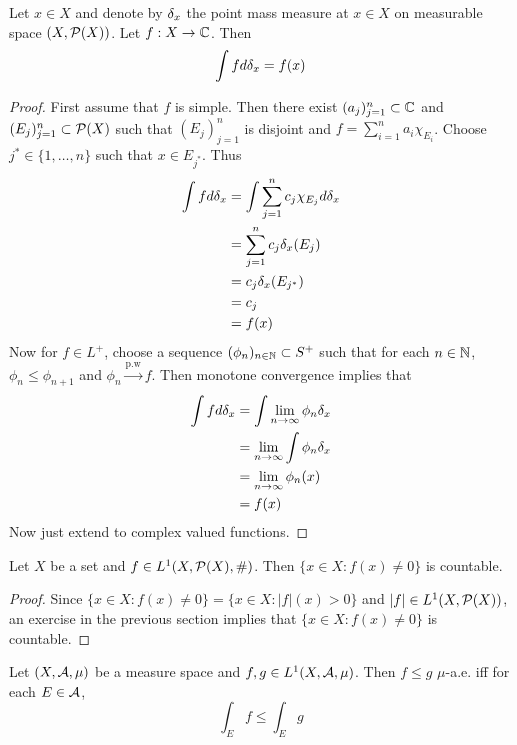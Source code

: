 \documentclass{book}
\begin{document}
	\begin{ex}  
		Let $x \in X$ and denote by $\delta_x$ the point mass measure at $x \in X$ on  measurable space $(X, \mathcal{P}(X))$. Let $f:X \rightarrow \mathbb{C}$. Then $$\int f d \delta_x = f(x)$$  
	\end{ex}
	
	\begin{proof}
		First assume that $f$ is simple. Then there exist $(a_j)_{j=1}^n \subset \mathbb{C}$ and $(E_j)_{j=1}^n \subset \mathcal{P}(X)$ such that $(E_j)_{j=1}^n$ is disjoint and $f = \sum\limits_{i = 1}^n a_i\chi_{E_i}$. Choose $j^* \in \{1, \ldots, n\}$ such that $x \in E_{j^*}$. Thus 
		\begin{align*}
		\int f d\delta_x 
		&= \int \sum\limits_{j=1}^n c_j \chi_{E_j} d \delta_x \\
		&= \sum\limits_{j=1}^n c_j \delta_x(E_j) \\
		&= c_j \delta_x(E_{j^*}) \\
		&= c_j \\
		&= f(x)
		\end{align*} 
		Now for $f \in L^+$, choose a sequence $(\phi_n)_{n \in \mathbb{N}} \subset S^+$ such that for each $n \in \mathbb{N}$, $\phi_n \leq \phi_{n+1}$ and $\phi_n \xrightarrow{\text{p.w}} f$. Then monotone convergence implies that 
		\begin{align*}
		\int f d \delta_x 
		&= \int \lim \limits_{n \rightarrow \infty} \phi_n  \delta_x \\
		&= \lim \limits_{n \rightarrow \infty} \int \phi_n \delta_x \\
		&= \lim \limits_{n \rightarrow \infty} \phi_n(x) \\
		&= f(x) 
		\end{align*}
		Now just extend to complex valued functions.
		
	\end{proof}
	
	\begin{ex}  
		Let $X$ be a set and $f \in L^1(X, \mathcal{P}(X), \#)$. Then $\{x \in X: f(x) \neq 0\}$ is countable.
	\end{ex}
	
	\begin{proof} 
		Since $\{x \in X: f(x) \neq 0\} = \{x \in X: |f|(x) > 0\}$ and $|f| \in L^1(X, \mathcal{P}(X))$, an exercise in the previous section implies that $\{x \in X: f(x) \neq 0\}$ is countable.
	\end{proof}
	
	\begin{ex}  
		Let $(X, \mathcal{A}, \mu)$ be a measure space and $f,g \in L^1(X, \mathcal{A}, \mu)$. Then $f \leq g$ $\mu$-a.e. iff for each $E \in \mathcal{A}$, 
		$$\int_E f \leq \int_E g$$  
	\end{ex}
	
\end{document}
